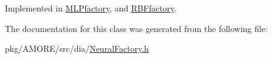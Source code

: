 Implemented in \hyperlink{class_m_l_pfactory_a18bbb914f7b974c0f8c5dd3913f6dd1c}{MLPfactory}, and \hyperlink{class_r_b_ffactory_a92fc16863bf60ebd93be1f108ce95ad6}{RBFfactory}.



The documentation for this class was generated from the following file:\begin{DoxyCompactItemize}
\item 
pkg/AMORE/src/dia/\hyperlink{_neural_factory_8h}{NeuralFactory.h}\end{DoxyCompactItemize}
